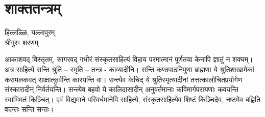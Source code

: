 \chapter{शाक्ततन्त्रम्}

\begin{center}
\smallskip


हित्लळ्ळि, यल्लापुरम्\\
श्रीगुरुः शरणम्
\end{center}

आकाशवद् विस्तृतम्, सागरवद् गभीरं संस्कृतसाहित्यं विहाय परमात्मानं पूर्णतया केनापि ज्ञातुं न शक्यम्। अत्र साहित्ये सन्ति श्रुति – स्मृति – तन्त्र - काव्यादीनि। सन्ति कण्ठपाठनिपुणा ब्राह्मणा ये श्रुतिशाखामेकां करामलकवत् साक्षात्कुर्वन्ति कारयन्ति वा। सन्त्येव केचिद् ये श्रुतिस्मृत्यादीनां तत्तत्कालोचितप्रयोगेण संस्कारादीन् निर्वर्तयन्ति। सन्त्येव बहवो ये कालिदासादीन् अनुवर्तमानाः कविमार्गपरायणाः कवयन्ति स्वाभिमतं किञ्चित्। एवं विद्यमाने परिवर्धमानेपि साहित्ये, संस्कृतसाहित्येव शिष्टं किञ्चिदेव, नष्टमेव बह्विति वदन्तः सन्ति सन्तः।

